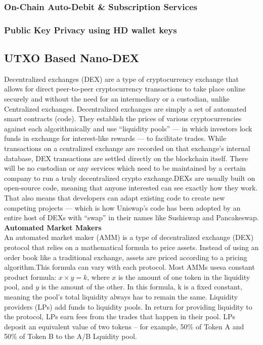 \documentclass[letterpaper,11pt]{article}
\begin{document}
		\subsubsection{On-Chain Auto-Debit \& Subscription Services}
		
		\subsubsection{Public Key Privacy using HD wallet keys}
		
		
\subsection{UTXO Based Nano-DEX}	

Decentralized exchanges (DEX) are a type of cryptocurrency exchange that allows for direct peer-to-peer cryptocurrency transactions to take place online securely and without the need for an intermediary or a custodian, unlike Centralized exchanges. Decentralized exchanges are simply a set of automated smart contracts (code). They establish the prices of various cryptocurrencies against each algorithmically and use “liquidity pools” — in which investors lock funds in exchange for interest-like rewards — to facilitate trades. While transactions on a centralized exchange are recorded on that exchange’s internal database, DEX transactions are settled directly on the blockchain itself. There will be no custodian or any services which need to be maintained by a certain company to run a truly decentralized crypto exchange.DEXs are usually built on open-source code, meaning that anyone interested can see exactly how they work. That also means that developers can adapt existing code to create new competing projects — which is how Uniswap’s code has been adopted by an entire host of DEXs with “swap” in their names like Sushiswap and Pancakeswap.\\

\textbf{Automated Market Makers}\\

An automated market maker (AMM) is a type of decentralized exchange (DEX) protocol that relies on a mathematical formula to price assets. Instead of using an order book like a traditional exchange, assets are priced according to a pricing algorithm.This formula can vary with each protocol. Most AMMs usesa constant product formula: $x  \times  y = k$, where $x$ is the amount of one token in the liquidity pool, and $y$ is the amount of the other. In this formula, k is a fixed constant, meaning the pool’s total liquidity always has to remain the same. Liquidity providers (LPs) add funds to liquidity pools. In return for providing liquidity to the protocol, LPs earn fees from the trades that happen in their pool. LPs deposit an equivalent value of two tokens – for example, 50\% of Token A and 50\% of Token B to the A/B Lquidity pool.\\
\end{document}
